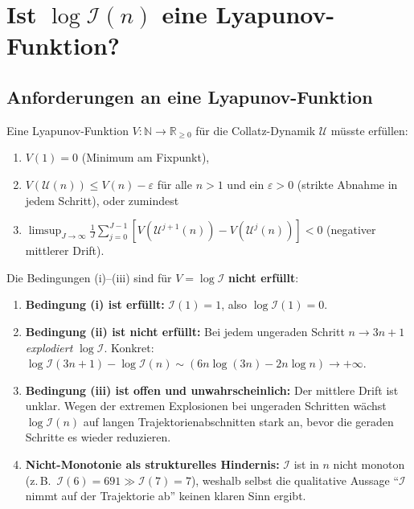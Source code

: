 \documentclass[12pt,a4paper]{article}
\newcommand{\U}{\mathcal{U}}
\newcommand{\N}{\mathbb{N}}
\newcommand{\R}{\mathbb{R}}
\newcommand{\In}{\mathcal{I}}      %
\begin{document}
\section{Ist \texorpdfstring{$\log \In(n)$}{log I(n)} eine Lyapunov-Funktion?}
\label{sec:lyapunov}

\subsection{Anforderungen an eine Lyapunov-Funktion}

Eine Lyapunov-Funktion $V\colon \N \to \R_{\geq 0}$ für die Collatz-Dynamik
$\U$ müsste erfüllen:
\begin{enumerate}[label=(\roman*)]
  \item $V(1) = 0$ (Minimum am Fixpunkt),
  \item $V(\U(n)) \leq V(n) - \varepsilon$ für alle $n > 1$ und ein $\varepsilon > 0$
    (strikte Abnahme in jedem Schritt), oder zumindest
  \item $\limsup_{J\to\infty}\frac{1}{J}\sum_{j=0}^{J-1} [V(\U^{j+1}(n)) - V(\U^j(n))] < 0$
    (negativer mittlerer Drift).
\end{enumerate}

\begin{tcolorbox}[lücke, title={$\log \In(n)$ ist keine Lyapunov-Funktion}]
Die Bedingungen (i)--(iii) sind für $V = \log\In$ \textbf{nicht erfüllt}:

\begin{enumerate}[leftmargin=*, label=(\alph*)]
  \item \textbf{Bedingung (i) ist erfüllt:} $\In(1) = 1$, also $\log\In(1) = 0$.

  \item \textbf{Bedingung (ii) ist nicht erfüllt:}
        Bei jedem ungeraden Schritt $n \to 3n+1$ \emph{explodiert} $\log\In$.
        Konkret: $\log\In(3n+1) - \log\In(n) \sim (6n\log(3n) - 2n\log n) \to +\infty$.

  \item \textbf{Bedingung (iii) ist offen und unwahrscheinlich:}
        Der mittlere Drift ist unklar. Wegen der extremen Explosionen bei ungeraden
        Schritten wächst $\log\In(n)$ auf langen Trajektorienabschnitten stark an,
        bevor die geraden Schritte es wieder reduzieren.

  \item \textbf{Nicht-Monotonie als strukturelles Hindernis:}
        $\In$ ist in $n$ nicht monoton (z.\,B.\ $\In(6) = 691 \gg \In(7) = 7$),
        weshalb selbst die qualitative Aussage
        ``$\In$ nimmt auf der Trajektorie ab'' keinen klaren Sinn ergibt.
\end{enumerate}
\end{tcolorbox}
\end{document}
